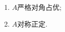 \documentclass[a4paper]{article}
\begin{document}
\begin{enumerate}
\begin{enumerate}[label=（\arabic*）]
\begin{solution}
    \end{solution}
    \item $A$严格对角占优;
    \begin{solution}
      
    \end{solution}
    \item $A$对称正定.
    \begin{solution}
      
    \end{solution}
  \end{enumerate}
\end{enumerate}
\end{document}
